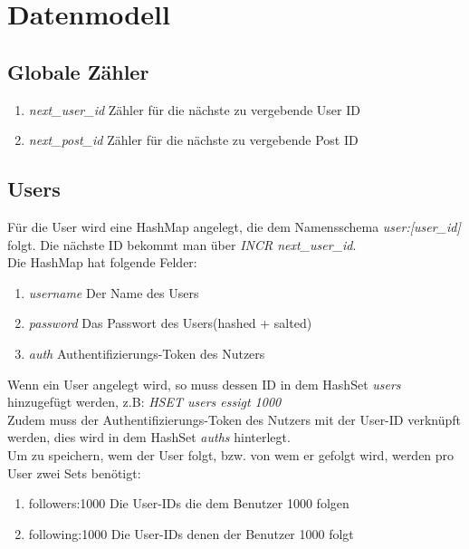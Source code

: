 \documentclass[
    a4paper
]{scrreprt}
\begin{document}
    \section{Datenmodell}
    
    \subsection*{Globale Zähler}
		\begin{enumerate}
			\item \textit{next\_user\_id} {Zähler für die nächste zu vergebende User ID}
			\item \textit{next\_post\_id} {Zähler für die nächste zu vergebende Post ID}
		\end{enumerate}
	
	\subsection*{Users}
		Für die User wird eine HashMap angelegt, die dem Namensschema \textit{user:[user\_id]} folgt. Die nächste ID bekommt man über \textit{INCR next\_user\_id}. \\
		Die HashMap hat folgende Felder:
		\begin{enumerate}
			\item \textit{username} {Der Name des Users}
			\item \textit{password} {Das Passwort des Users(hashed + salted)}
			\item \textit{auth} {Authentifizierungs-Token des Nutzers}			
		\end{enumerate}
		
		Wenn ein User angelegt wird, so muss dessen ID in dem HashSet \textit{users} hinzugefügt werden, z.B: \textit{HSET users essigt 1000}\\
		
		Zudem muss der Authentifizierungs-Token des Nutzers mit der User-ID verknüpft werden, dies wird in dem HashSet \textit{auths} hinterlegt. \\
		
		Um zu speichern, wem der User folgt, bzw. von wem er gefolgt wird, werden pro User zwei Sets benötigt:
		\begin{enumerate}
			\item followers:1000 {Die User-IDs die dem Benutzer 1000 folgen}
			\item following:1000 {Die User-IDs denen der Benutzer 1000 folgt}
		\end{enumerate}
\end{document}
